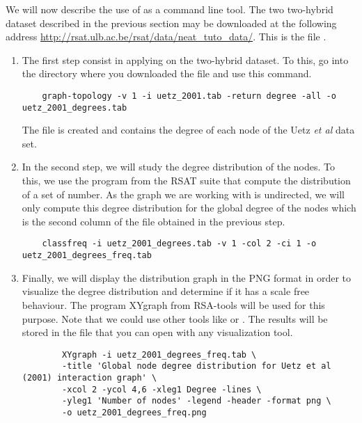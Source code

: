 We will now describe the use of  as a command line tool. 
The two two-hybrid dataset described
in the previous section may be downloaded at the following address \url{http://rsat.ulb.ac.be/rsat/data/neat\_tuto\_data/}. 
This is the file .

\begin{enumerate}

\item The first step consist in applying  on the two-hybrid dataset. To this, go into the
directory where you downloaded the file  and use this command. 
	
	{\color{Blue} \begin{footnotesize} 
		\begin{verbatim}
	graph-topology -v 1 -i uetz_2001.tab -return degree -all -o uetz_2001_degrees.tab
		\end{verbatim} \end{footnotesize}
	}		
The file  is created and contains the degree of each node of the Uetz \textit{et al} data set.

\item In the second step, we will study the degree distribution of the nodes. To this, we use the program  from the RSAT suite that compute the distribution of a set of number. As the graph we are working with is undirected, we will only compute this degree distribution for the global degree of the nodes which is the second column of the file  obtained in the previous step.
	
	{\color{Blue} \begin{footnotesize} 
		\begin{verbatim}
	classfreq -i uetz_2001_degrees.tab -v 1 -col 2 -ci 1 -o uetz_2001_degrees_freq.tab
		\end{verbatim} \end{footnotesize}
	}		

\item Finally, we will display the distribution graph in the PNG format in order to visualize the degree distribution and determine if it has a scale free behaviour. The program XYgraph from RSA-tools will be used for this purpose. Note that we could use other tools like  or . The results will be stored in the file  that you can open with any visualization tool.

	{\color{Blue} \begin{footnotesize} 
		\begin{verbatim}
		XYgraph -i uetz_2001_degrees_freq.tab \
		-title 'Global node degree distribution for Uetz et al (2001) interaction graph' \
		-xcol 2 -ycol 4,6 -xleg1 Degree -lines \
		-yleg1 'Number of nodes' -legend -header -format png \
		-o uetz_2001_degrees_freq.png
		\end{verbatim} 
\end{footnotesize}
	}
\end{enumerate}

